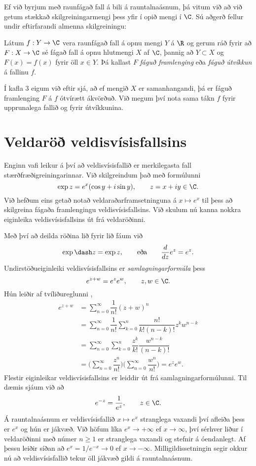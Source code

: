 Ef við byrjum með raunfágað fall á bili á rauntalnaásnum, þá vitum við
að við getum stækkað skilgreiningarmengi þess yfir í opið mengi í $\C$.
Sú aðgerð fellur undir eftirfarandi almenna skilgreiningu:

\begin{sk}
Látum $f:Y\to \C$ vera raunfágað fall á opnu mengi $Y$ á $\R$
og gerum ráð fyrir að $F:X\to \C$ sé fágað fall á opnu hlutmengi $X$ af
$\C$, þannig að $Y\subset X$ og $F(x)=f(x)$ fyrir öll $x\in Y$.  Þá
kallast $F$ {\it fáguð framlenging} eða {\it
fáguð útvíkkun}
á fallinu $f$.  
\end{sk}

Í kafla 3 eigum við eftir sjá, að ef mengið $X$ er
samanhangandi,  þá er fáguð framlenging $F$ á $f$ ótvírætt ákvörðuð.
Við megum því nota sama tákn $f$ fyrir upprunalega fallið og
fyrir útvíkkunina.
 
 
\section{Veldaröð veldisvísisfallsins}



\noindent
Enginn vafi leikur á því að veldisvísisfallið er merkilegasta fall
stærðfræðigreiningarinnar.    Við skilgreindum það með formúlunni
$$
\exp z=e^x(\cos y+i\sin y), \qquad z=x+iy \in \C.
$$
Við hefðum eins getað notað veldaraðarframsetninguna á $x\mapsto e^x$
til þess að skilgreina fágaða framlengingu veldisvísisfallsins.
Við skulum nú kanna nokkra eiginleika veldisvísisfallsins út frá
veldaröðinni.   


Með því að
deilda röðina lið fyrir lið fáum við 
 $$\exp\dash z=\exp z, \qquad \text{eða} \qquad \dfrac d{dz}e^z=e^z.
 $$
Undirstöðueiginleiki veldisvísisfallsins er {\it
samlagningarformúla
} þess
$$ e^{z+w}=e^ze^w, \qquad z,w\in \C. $$
Hún leiðir af tvíliðureglunni ,
\begin{align*}
e^{z+w}&=\sum_{n=0}^\infty\dfrac 1{n!}(z+w)^n\\
&=\sum_{n=0}^\infty\dfrac 1{n!}\sum_{k=0}^n \dfrac{n!}{k!(n-k)!}z^kw^{n-k}\\
&=\sum_{n=0}^\infty\sum_{k=0}^n \dfrac {z^k}{k!}\dfrac {w^{n-k}}{(n-k)!}\\
&=\bigg(\sum_{n=0}^\infty \dfrac {z^n}{n!}\bigg)\bigg(\sum_{n=0}^\infty\dfrac
{w^{n}}{n!}\bigg)=e^ze^w. 
\end{align*}
Flestir eiginleikar veldisvísisfallsins er leiddir út frá
samlagningarformúlunni.  Til dæmis sjáum við að 
 \begin{equation*}e^{-z}=\dfrac 1{e^z}, \qquad z\in \C.\label{4.5.1}
 \end{equation*}
Á rauntalnaásnum er veldisvísisfallið $x\mapsto e^x$
stranglega vaxandi því afleiða þess er $e^x$ og hún er jákvæð.
Við höfum líka $e^x\to+\infty$ ef
$x\to \infty$, því sérhver liður í veldaröðinni með
númer $n\geq 1$ er stranglega vaxandi og stefnir á óendanlegt. Af
þessu leiðir síðan að $e^{x}=1/e^{-x}\to 0$ ef $x\to -\infty$.
Milligildissetningin segir okkur nú að veldisvísisfallið tekur öll
jákvæð gildi á rauntalnaásnum.  



